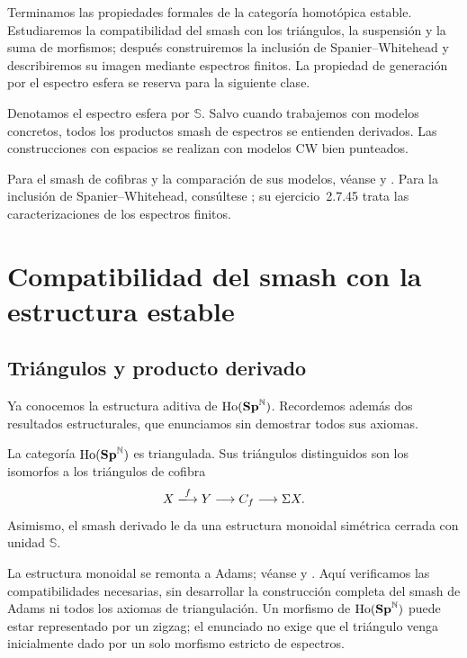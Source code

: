 
Terminamos las propiedades formales de la categoría homotópica estable. Estudiaremos la compatibilidad del smash con los triángulos, la suspensión y la suma de morfismos; después construiremos la inclusión de Spanier--Whitehead y describiremos su imagen mediante espectros finitos. La propiedad de generación por el espectro esfera se reserva para la siguiente clase.

Denotamos el espectro esfera por $\mathbb S$. Salvo cuando trabajemos con modelos concretos, todos los productos smash de espectros se entienden derivados. Las construcciones con espacios se realizan con modelos CW bien punteados.

Para el smash de cofibras y la comparación de sus modelos, véanse \cite[lema~2.4.6.1]{malkiewich} y \cite[III, \S4, teorema~4.2]{adams1974}. Para la inclusión de Spanier--Whitehead, consúltese \cite[corolario~3.2.2.2 y \S4.2.2]{malkiewich}; su ejercicio~2.7.45 trata las caracterizaciones de los espectros finitos.

\section{Compatibilidad del smash con la estructura estable}

\subsection{Triángulos y producto derivado}
Ya conocemos la estructura aditiva de $\operatorname{Ho}(\mathbf{Sp}^{\mathbb N})$. Recordemos además dos resultados estructurales, que enunciamos sin demostrar todos sus axiomas.
\begin{teo}\label{teo:c18-estructura}
La categoría $\operatorname{Ho}(\mathbf{Sp}^{\mathbb N})$ es triangulada. Sus triángulos distinguidos son los isomorfos a los triángulos de cofibra
\[
X\xlongrightarrow{f}Y\longrightarrow C_f\longrightarrow\Sigma X.
\]
Asimismo, el smash derivado le da una estructura monoidal simétrica cerrada con unidad $\mathbb S$.
\end{teo}
\begin{nota}
La estructura monoidal se remonta a Adams; véanse \cite{adams1974} y \cite[capítulos~3 y~4]{malkiewich}. Aquí verificamos las compatibilidades necesarias, sin desarrollar la construcción completa del smash de Adams ni todos los axiomas de triangulación. Un morfismo de $\operatorname{Ho}(\mathbf{Sp}^{\mathbb N})$ puede estar representado por un zigzag; el enunciado no exige que el triángulo venga inicialmente dado por un solo morfismo estricto de espectros.
\end{nota}

